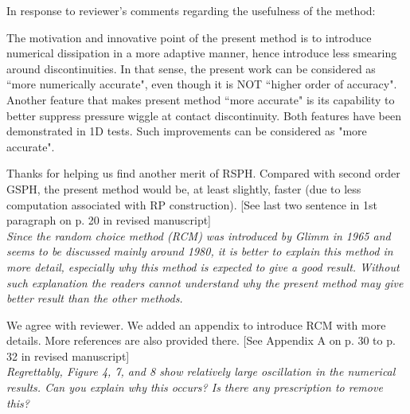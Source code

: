 \documentclass[10pt,a4paper]{article}
\begin{document}
In response to reviewer's comments regarding the usefulness of the method:

The motivation and innovative point of the present method is to introduce numerical dissipation in a more adaptive manner, hence introduce less smearing around discontinuities. In that sense, the present work can be considered as ``more numerically accurate", even though it is NOT ``higher order of accuracy". Another feature that makes present method ``more accurate" is its capability to better suppress pressure wiggle at contact discontinuity. Both features have been demonstrated in 1D tests. Such improvements can be considered as "more accurate".
 
Thanks for helping us find another merit of RSPH. Compared with second order GSPH, the present method would be, at least slightly, faster (due to less computation associated with RP construction).
[See last two sentence in 1st paragraph on p. 20 in revised manuscript] \\[3pt]

\textit{Since the random choice method (RCM) was introduced by Glimm in 1965 and seems to be discussed mainly around 1980, it is better to explain this method in more detail, especially why this method is expected to give a good result. Without such explanation the readers cannot understand why the present method may give better result than the other methods.}

We agree with reviewer. We added an appendix to introduce RCM with more details. More references are also provided there.
[See Appendix A on p. 30 to p. 32 in revised manuscript]\\[3pt]

\textit{Regrettably, Figure 4, 7, and 8 show relatively large oscillation in the
numerical results. Can you explain why this occurs? Is there any prescription to remove this?}
\end{document}
